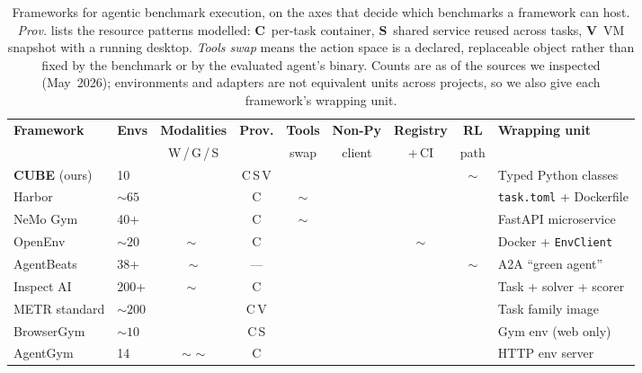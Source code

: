\documentclass{article}
\newcommand{\cmark}{\ding{51}}
\newcommand{\xmark}{\ding{55}}
\newcommand{\pmark}{$\sim$}
\begin{document}
\begin{table}[t]
\centering
\caption{Frameworks for agentic benchmark execution, on the axes that decide
which benchmarks a framework can host. \emph{Prov.} lists the resource patterns
modelled: \textbf{C}~per-task container, \textbf{S}~shared service reused
across tasks, \textbf{V}~VM snapshot with a running desktop. \emph{Tools swap}
means the action space is a declared, replaceable object rather than fixed by
the benchmark or by the evaluated agent's binary. Counts are as of the sources
we inspected (May~2026); environments and adapters are not equivalent units
across projects, so we also give each framework's wrapping unit.}
\label{tab:framework-comparison}
\footnotesize
\setlength{\tabcolsep}{4pt}
\renewcommand{\arraystretch}{1.12}
\begin{tabular}{llccccccl}
\toprule
\textbf{Framework} & \textbf{Envs} & \textbf{Modalities} & \textbf{Prov.}
& \textbf{Tools} & \textbf{Non-Py} & \textbf{Registry} & \textbf{RL}
& \textbf{Wrapping unit} \\
 & & \small W\,/\,G\,/\,S & & \small swap & \small client & \small +\,CI & \small path & \\
\midrule
\textbf{CUBE} (ours) & 10 & \cmark\,\cmark\,\cmark & C\,S\,V & \cmark & \cmark & \cmark & \pmark
  & Typed Python classes \\
Harbor \citep{Shaw_Harbor_Framework_2025} & ${\sim}65$ & \xmark\,\xmark\,\cmark & C & \pmark & \cmark & \cmark & \cmark
  & \texttt{task.toml} + Dockerfile \\
NeMo Gym \citep{nemo-gym} & 40+ & \xmark\,\xmark\,\cmark & C & \pmark & \cmark & \xmark & \cmark
  & FastAPI microservice \\
OpenEnv \citep{openenv2025} & ${\sim}20$ & \pmark\,\xmark\,\cmark & C & \xmark & \cmark & \pmark & \cmark
  & Docker + \texttt{EnvClient} \\
AgentBeats \citep{agentbeats2025} & 38+ & \cmark\,\pmark\,\cmark & --- & \cmark & \cmark & \cmark & \pmark
  & A2A ``green agent'' \\
Inspect AI \citep{inspect_ai} & 200+ & \pmark\,\xmark\,\cmark & C & \cmark & \xmark & \xmark & \xmark
  & Task + solver + scorer \\
METR standard \citep{metr_task_standard_2024} & ${\sim}200$ & \xmark\,\xmark\,\cmark & C\,V & \xmark & \xmark & \xmark & \xmark
  & Task family image \\
BrowserGym \citep{chezelles2025browsergym} & ${\sim}10$ & \cmark\,\xmark\,\xmark & C\,S & \cmark & \xmark & \xmark & \xmark
  & Gym env (web only) \\
AgentGym \citep{xi2025agentgym} & 14 & \pmark\,\xmark\,\pmark & C & \xmark & \cmark & \xmark & \cmark
  & HTTP env server \\
\bottomrule
\end{tabular}
\end{table}
\end{document}
